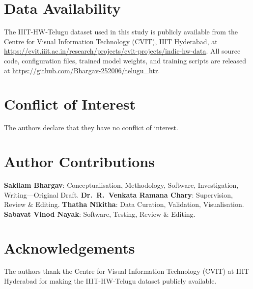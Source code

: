 \documentclass[pdflatex,sn-mathphys-num]{sn-jnl}
\begin{document}

\section*{Data Availability}
The IIIT-HW-Telugu dataset used in this study is publicly available from the Centre for Visual Information Technology (CVIT), IIIT Hyderabad, at \url{https://cvit.iiit.ac.in/research/projects/cvit-projects/indic-hw-data}. All source code, configuration files, trained model weights, and training scripts are released at \url{https://github.com/Bhargav-252006/telugu_htr}.

\section*{Conflict of Interest}
The authors declare that they have no conflict of interest.

\section*{Author Contributions}
\textbf{Sakilam Bhargav}: Conceptualisation, Methodology, Software, Investigation, Writing---Original Draft.
\textbf{Dr.\ R.\ Venkata Ramana Chary}: Supervision, Review \& Editing.
\textbf{Thatha Nikitha}: Data Curation, Validation, Visualisation.
\textbf{Sabavat Vinod Nayak}: Software, Testing, Review \& Editing.

\section*{Acknowledgements}
The authors thank the Centre for Visual Information Technology (CVIT) at IIIT Hyderabad for making the IIIT-HW-Telugu dataset publicly available.
\end{document}

